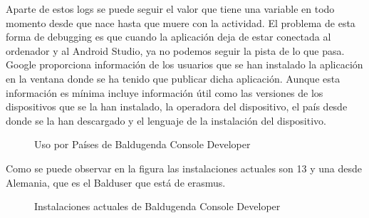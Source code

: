 Aparte de estos logs se puede seguir el valor que tiene una variable en todo momento desde que nace hasta que muere con la actividad.
El problema de esta forma de debugging es que cuando la aplicación deja de estar conectada al ordenador y al Android Studio, ya no podemos seguir la pista de lo que pasa.
Google proporciona información de los usuarios que se han instalado la aplicación en la ventana donde se ha tenido que publicar dicha aplicación. Aunque esta información es mínima incluye información útil como las versiones de los dispositivos que se la han instalado, la operadora del dispositivo, el país desde donde se la han descargado y el lenguaje de la instalación del dispositivo.
\newpage
\begin{figure}[H] 
  \begin{center} 
    \caption{Uso por Países de Baldugenda Console Developer} 
    \label{fig:UsoPorPaises} 
  \end{center} 
\end{figure}

Como se puede observar en la figura las instalaciones actuales son 13 y una desde Alemania, que es el Balduser que está de erasmus.

\begin{figure}[H] 
  \begin{center} 
    \caption{Instalaciones actuales de Baldugenda Console Developer} 
    \label{fig:InstalacionesActuales} 
  \end{center} 
\end{figure}

